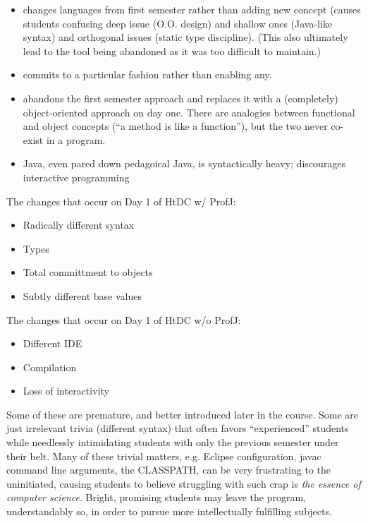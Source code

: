 \documentclass[submission,copyright]{eptcs}
\begin{document}
\begin{itemize}
\item changes languages from first semester rather than adding new
  concept (causes students confusing deep issue (O.O. design) and
  shallow ones (Java-like syntax) and orthogonal issues (static type
  discipline).  (This also ultimately lead to the tool being abandoned
  as it was too difficult to maintain.)

\item commits to a particular fashion rather than enabling any.

\item abandons the first semester approach and replaces it with a
  (completely) object-oriented approach on day one.  There are
  analogies between functional and object concepts (``a method is like
  a function''), but the two never co-exist in a program.

\item Java, even pared down pedagoical Java, is syntactically heavy; discourages
  interactive programming

\end{itemize}

The changes that occur on Day 1 of HtDC w/ ProfJ:

\begin{itemize}
\item Radically different syntax
\item Types
\item Total committment to objects
\item Subtly different base values
\end{itemize}

The changes that occur on Day 1 of HtDC w/o ProfJ:

\begin{itemize}
\item Different IDE
\item Compilation
\item Loss of interactivity
\end{itemize}

Some of these are premature, and better introduced later in the
course.  Some are just irrelevant trivia (different syntax) that often
favors ``experienced'' students while needlessly intimidating students
with only the previous semester under their belt.  Many of these
trivial matters, e.g. Eclipse configuration, javac command line
arguments, the CLASSPATH, can be very frustrating to the uninitiated,
causing students to believe struggling with such crap is \emph{the
  essence of computer science}.  Bright, promising students may leave
the program, understandably so, in order to pursue more intellectually
fulfilling subjects.
\end{document}
